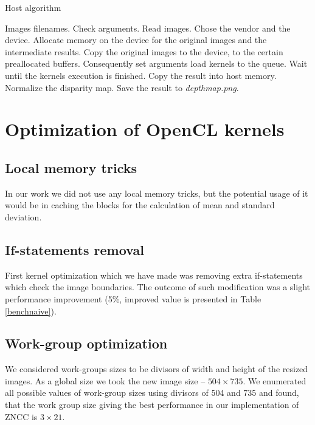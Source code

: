 \documentclass[conference]{IEEEtran}
\begin{document}
 \begin{algorithm}
 \caption{Host algorithm}\label{hostcode}
 \begin{algorithmic}[1]
 \renewcommand{\algorithmicrequire}{\textbf{Input:}}
 \renewcommand{\algorithmicensure}{\textbf{Output:}}
 \REQUIRE Images filenames.
  \STATE Check arguments.
  \STATE Read images.
  \STATE Chose the vendor and the device.
  \STATE Allocate memory on the device for the original images and the intermediate results.
  \STATE Copy the original images to the device, to the certain preallocated buffers.
  \STATE Consequently set arguments load kernels to the queue.
  \STATE Wait until the kernels execution is finished.
  \STATE Copy the result into host memory.
  \STATE Normalize the disparity map.
  \STATE Save the result to \textit{depthmap.png}.
 \end{algorithmic} 
 \end{algorithm}

\section{Optimization of OpenCL kernels}\label{sec:Optimization}
\subsection{Local memory tricks} 
In our work we did not use any local memory tricks, but the potential usage of it would be in caching the blocks for the calculation of mean and standard deviation.

\subsection{If-statements removal}
First kernel optimization which we have made was removing extra if-statements  which check the image boundaries. The outcome of such modification was a slight performance improvement (5\%, improved value is presented in Table \ref{benchnaive}).

\subsection{Work-group optimization}
We considered work-groups sizes to be divisors of width and height of the resized images. As a global size we took the new image size -- $504\times735$. We enumerated all possible values of work-group sizes using divisors of 504 and 735 and found, that the work group size giving the best performance in our implementation of ZNCC is $3\times21$.
\end{document}
